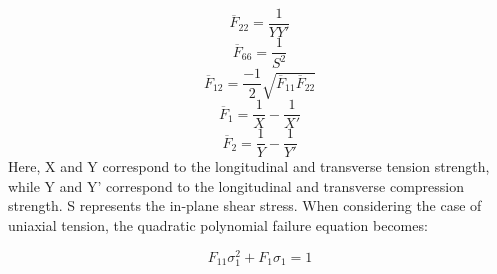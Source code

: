 \begin{equation}
    \overline{F}_{22} = \frac{1}{YY'}
\end{equation}
\begin{equation}
    \overline{F}_{66} = \frac{1}{S^2}
\end{equation}
\begin{equation}
    \overline{F}_{12} = \frac{-1}{2}\sqrt{\overline{F}_{11} \overline{F}_{22}}
\end{equation}
\begin{equation}
    \overline{F}_{1} = \frac{1}{X} - \frac{1}{X'}
\end{equation}
\begin{equation}
    \overline{F}_{2} = \frac{1}{Y} - \frac{1}{Y'}
\end{equation}
Here, X and Y correspond to the longitudinal and transverse tension strength, while Y and Y' correspond to the longitudinal and transverse compression strength. S represents the in-plane shear stress. When considering the case of uniaxial tension, the quadratic polynomial failure equation becomes:

\begin{equation}
    F_{11} \sigma_{1}^2 + F_1 \sigma_1 = 1
\end{equation}







